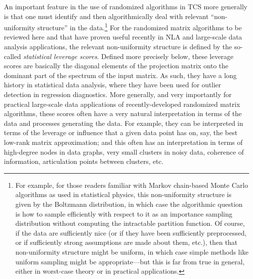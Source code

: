 \documentclass[twoside]{article}
\begin{document}
An important feature in the use of randomized algorithms in TCS more 
generally is that one must identify and then algorithmically deal with
relevant ``non-uniformity structure'' in the data.\footnote{For example, for those readers familiar with Markov chain-based 
Monte Carlo algorithms as used in statistical physics, this non-uniformity 
structure is given by the Boltzmann distribution, in which case the 
algorithmic question is how to sample efficiently with respect to it as an 
importance sampling distribution without computing the intractable partition 
function.  
Of course, if the data are sufficiently nice (or if they have been 
sufficiently preprocessed, or if sufficiently strong assumptions are made 
about them, etc.), then that non-uniformity structure might be uniform, in 
which case simple methods like uniform sampling might be appropriate---but 
this is far from true in general, either in worst-case theory or in practical 
applications.}
For the randomized matrix algorithms to be reviewed here and that have proven 
useful recently in NLA and large-scale data analysis 
applications, the relevant non-uniformity structure
is defined by the so-called \emph{statistical leverage 
scores}.
Defined more precisely below, these leverage scores are basically the 
diagonal elements of the projection matrix onto the dominant part of the 
spectrum of the input matrix.
As such, they have a long history in statistical data analysis, where they 
have been used for outlier detection in regression diagnostics.
More generally, and very importantly for practical large-scale data 
applications of recently-developed randomized matrix algorithms, these 
scores often have a very natural interpretation in terms of the data and 
processes generating the data.
For example, they can be interpreted in terms of the leverage or influence 
that a given data point has on, say, the best low-rank matrix approximation; 
and this often has an interpretation in terms of high-degree nodes in data 
graphs, very small clusters in noisy data, coherence of information, 
articulation points between clusters, etc.
\end{document}
